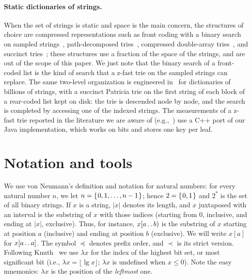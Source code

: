 \documentclass[a4paper]{article}
\newcommand{\?}{\mskip1.5mu}
\def\..{\,\mathpunct{\ldotp\ldotp}} %
\begin{document}
\paragraph{Static dictionaries of strings.} When the set of strings is static and space is the main concern, the structures of choice are
compressed representations such as front coding with a binary search on sampled strings~\cite{MartinezPrieto2016Practical}, 
path-decomposed tries~\cite{Grossi2015Fast}, compressed double-array tries~\cite{Kanda2017Compressed}, and succinct tries~\cite{Zhang2020Succinct,Boffa2024CoCo}; these structures use a fraction of the space of the strings, 
and are out of the scope of this paper. We just note that the binary search of a front-coded list is the kind of search that a z-fast trie on 
the sampled strings can replace. 
The same two-level organization is engineered in~\cite{Ferragina2025Two} for dictionaries of billions of strings, 
with a succinct Patricia trie on the first string of each block of a rear-coded list kept on disk: the trie 
is descended node by node, and the search is completed by accessing one of the indexed strings.
The measurements of a z-fast trie reported in the literature we are aware of (e.g.,~\cite{TKKctriepp,Kanda2020Dynamic,Zhang2026C2}) 
use a C++ port of our Java implementation, which works on bits and stores one key per leaf.

\section{Notation and tools}
\label{sec:notation}

We use von Neumann's definition
and notation for natural numbers: for every natural number $n$, we let $n=\{\?0,1,\ldots,n-1\?\}$; 
hence $2=\{\?0,1\?\}$
and $2^*$ is the set of all binary strings.
If $x$ is a string, $|x|$ denotes its length, and $x$ juxtaposed with an interval is the substring of $x$ with
those indices (starting from 0, inclusive, and ending at $|x|$, exclusive). 
Thus, for instance, $x[a\..b)$
is the substring of $x$ starting at position $a$ (inclusive) and ending at position
$b$ (exclusive). We will write $x[a]$ for $x[a\..a]$. The symbol $\preceq$
denotes prefix order, and $\prec$ is its strict version. Following Knuth~\cite[7.1.3]{KnuACPIV} we use $\lambda x$ for
the index of the highest bit set, or most significant bit (i.e., $\lambda x = \lfloor \lg x \rfloor$; $\lambda x$ is undefined when $x\leq 0$).
Note the easy mnemonics: $\lambda x$ is the position of the \emph{leftmost} one.
\end{document}
